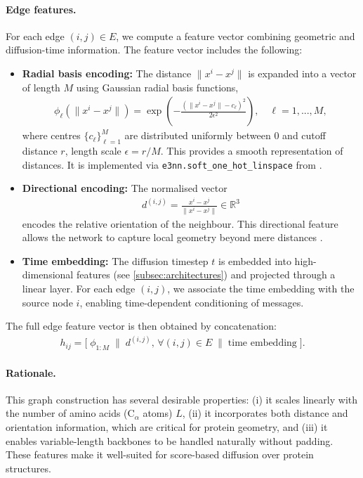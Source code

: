 \documentclass[a4paper,12pt]{article}
\begin{document}
\paragraph{Edge features.}
For each edge \((i,j) \in E\), we compute a feature vector combining geometric and diffusion-time information. The feature vector includes the following:
\begin{itemize}
    \item \textbf{Radial basis encoding:} The distance \(\|x^i - x^j\|\) is expanded into a vector of length \(M\) using Gaussian radial basis functions,
        \begin{align*}
            \phi_\ell(\|x^i - x^j\|) = \exp\!\left(-\frac{(\|x^i - x^j\|-c_\ell)^2}{2\epsilon^2}\right),\quad \ell=1,...,M,
        \end{align*}
        where centres \(\{c_\ell\}_{\ell=1}^M\) are distributed uniformly between \(0\) and cutoff distance \(r\), length scale \(\epsilon=r/M\). This provides a smooth representation of distances. It is implemented via \texttt{e3nn.soft\_one\_hot\_linspace} from \citet{geiger2022E3nnEuclideanNeural,geiger2025EuclideanNeuralNetworks}.
    \item \textbf{Directional encoding:} The normalised vector
        \begin{align*}
            d^{\left(i,j\right)} = \frac{x^i - x^j}{\|x^i - x^j\|}\in \mathbb{R}^{3}
        \end{align*}
        encodes the relative orientation of the neighbour. This directional feature allows the network to capture local geometry beyond mere distances \citep{watsonNovoDesignProtein2023}.
    \item \textbf{Time embedding:} The diffusion timestep \(t\) is embedded into high-dimensional features (see \cref{subsec:architectures}) and projected through a linear layer. For each edge \((i,j)\), we associate the time embedding with the source node \(i\), enabling time-dependent conditioning of messages.
\end{itemize}
The full edge feature vector is then obtained by concatenation:
\begin{align*}
    h_{ij} = \big[ \;\phi_{1:M}\;\|\; d^{\left(i,j\right)},\,\forall \left(i,j\right)\in E \;\|\; \text{time embedding} \;\big].
\end{align*}

\paragraph{Rationale.}
This graph construction has several desirable properties: (i) it scales linearly with the number of amino acids (C\(_\alpha\) atoms) \(L\), (ii) it incorporates both distance and orientation information, which are critical for protein geometry, and (iii) it enables variable-length backbones to be handled naturally without padding. These features make it well-suited for score-based diffusion over protein structures.
\end{document}
